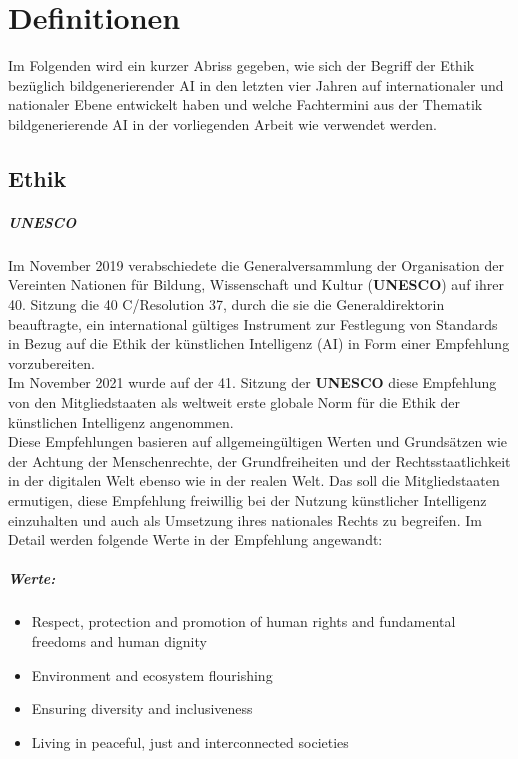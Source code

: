 \documentclass[12pt]{report}
\begin{document}

\chapter{Definitionen}
Im Folgenden wird ein kurzer Abriss gegeben, wie sich der Begriff der Ethik bezüglich bildgenerierender AI in den letzten vier Jahren auf internationaler und nationaler Ebene entwickelt haben und welche Fachtermini aus der Thematik bildgenerierende AI in der vorliegenden Arbeit wie verwendet werden.
\section{Ethik}\label{def_ai}

\paragraph{UNESCO\cite{UNESCO}\\}
Im November 2019 verabschiedete die Generalversammlung der Organisation der Vereinten Nationen für Bildung, Wissenschaft und Kultur (\textbf{UNESCO}) auf ihrer 40. Sitzung die 40 C/Resolution 37, durch die sie die Generaldirektorin beauftragte, \glqq ein international gültiges Instrument zur Festlegung von Standards in Bezug auf die Ethik der künstlichen Intelligenz (AI) in Form einer Empfehlung vorzubereiten\glqq{}.\\Im November 2021 wurde auf der 41. Sitzung der \textbf{UNESCO} diese Empfehlung von den Mitgliedstaaten als weltweit erste globale Norm für die Ethik der künstlichen Intelligenz angenommen.\\

Diese Empfehlungen basieren auf allgemeingültigen Werten und Grundsätzen wie der Achtung der Menschenrechte, der Grundfreiheiten und der Rechtsstaatlichkeit in der digitalen Welt ebenso wie in der realen Welt. Das soll die Mitgliedstaaten ermutigen, diese Empfehlung freiwillig bei der Nutzung künstlicher Intelligenz einzuhalten und auch als Umsetzung ihres nationales Rechts zu begreifen. Im Detail werden folgende Werte in der Empfehlung angewandt:

\paragraph{Werte:}
\begin{itemize}
	\item Respect, protection and promotion of human rights and fundamental freedoms and human dignity
	\item Environment and ecosystem flourishing
	\item Ensuring diversity and inclusiveness
	\item Living in peaceful, just and interconnected societies
\end{itemize}
\end{document}
